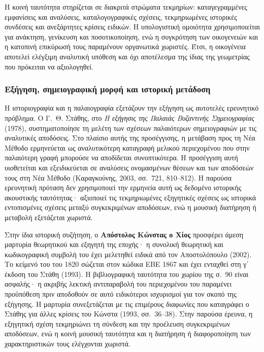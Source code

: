 \documentclass[11pt,a4paper]{article}
\begin{document}
Η κοινή ταυτότητα στηρίζεται σε διακριτά στρώματα τεκμηρίων: καταγεγραμμένες εμφανίσεις και αναλύσεις, καταλογογραφικές σχέσεις, τεκμηριωμένες ιστορικές συνδέσεις και ανεξάρτητες κρίσεις ειδικών. Η υπολογιστική ομοιότητα χρησιμοποιείται για ανάκτηση, γενίκευση και ποσοτικοποίηση, ενώ η συγκρότηση των οικογενειών και η κατοπινή επικύρωσή τους παραμένουν οργανωτικά χωριστές. Έτσι, η οικογένεια αποτελεί ελέγξιμη αναλυτική υπόθεση και όχι αποτέλεσμα της ίδιας της γεωμετρίας που πρόκειται να αξιολογηθεί.

\subsubsection{Εξήγηση, σημειογραφική μορφή και ιστορική μετάδοση}

Η ιστοριογραφία και η παλαιογραφία εξετάζουν την εξήγηση ως αυτοτελές ερευνητικό πρόβλημα. Ο Γ.~Θ. Στάθης, στο \emph{Η εξήγησις της Παλαιάς Βυζαντινής Σημειογραφίας} (1978), συστηματοποίησε τη μελέτη των σχέσεων παλαιότερων σημειογραφιών με τις αναλυτικές αποδόσεις. Στο πλαίσιο αυτής της προσέγγισης, η μετάβαση προς τη Νέα Μέθοδο ερμηνεύεται ως αναλυτικότερη καταγραφή μελικού περιεχομένου που στην παλαιότερη γραφή μπορούσε να αποδίδεται συνοπτικότερα. Η προσέγγιση αυτή υιοθετείται και εξειδικεύεται σε αναλύσεις ονομασμένων θέσεων και των αποδόσεών τους στη Νέα Μέθοδο (Καραγκούνης, 2003, σσ.~721, 810--812). Η παρούσα ερευνητική πρόταση δεν χρησιμοποιεί την ερμηνεία αυτή ως δεδομένο ιστορικής ακουστικής ταυτότητας· αξιοποιεί τις τεκμηριωμένες εξηγητικές σχέσεις ως ιστορικά εντοπισμένες σχέσεις μεταξύ συγκεκριμένων αποδόσεων, ενώ η μουσική διατήρηση ή μεταβολή εξετάζεται χωριστά.

Στην ίδια ιστορική συζήτηση, ο \textbf{Απόστολος Κώνστας ο Χίος} προσφέρει άμεση μαρτυρία θεωρητικού και εξηγητή της εποχής· η συνολική θεωρητική και κωδικογραφική συμβολή του έχει μελετηθεί ειδικά από τον Αποστολόπουλο (2002). Το κείμενό του του 1820 σώζεται στον κώδικα ΕΒΕ 1867 και έχει ενταχθεί στη γ΄ έκδοση του Στάθη (1993). Η βιβλιογραφική ταυτότητα του χωρίου της σ.~90 είναι ασφαλής· η ακριβής λεκτική αντιπαραβολή του περιεχομένου του παραμένει προϋπόθεση πριν αποδοθούν σε αυτό ειδικότεροι ισχυρισμοί για τον σκοπό της εξήγησης. Η μαρτυρία συνεξετάζεται με τις επιμέρους διαφωνίες που καταγράφει ο Στάθης για άλλες κρίσεις του Κώνστα (1993, σσ.~36--38). Στην παρούσα έρευνα, η εξηγητική σχέση τεκμηριώνει τη σύνδεση και την προέλευση συγκεκριμένων αποδόσεων, ενώ η κοινή μουσική ταυτότητα και η διατήρηση ή διαφοροποίηση των χαρακτηριστικών τους ελέγχονται χωριστά.
\end{document}
